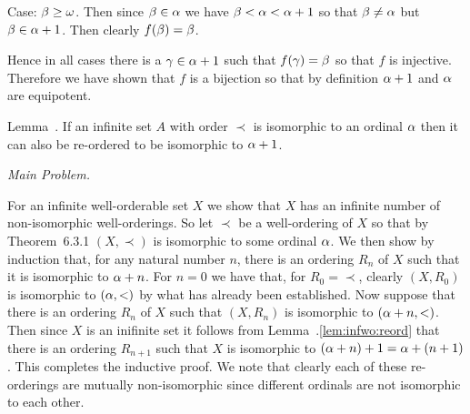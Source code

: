 \begin{solution}
{      Case: $\beta \geq \omega$.
      Then since $\beta \in \alpha$ we have $\beta < \alpha < \alpha+1$ so that $\beta \neq \alpha$ but $\beta \in \alpha+1$.
      Then clearly $f(\beta) = \beta$.

      Hence in all cases there is a $\gamma \in \alpha+1$ such that $f(\gamma) = \beta$ so that $f$ is injective.
      Therefore we have shown that $f$ is a bijection so that by definition $\alpha+1$ and $\alpha$ are equipotent. \qedsymbol

      \begin{statement}{Lemma~\ex.}
        If an infinite set $A$ with order $\prec$ is isomorphic to an ordinal $\alpha$ then it can also be re-ordered to be isomorphic to $\alpha + 1$.
      \end{statement}


      \emph{Main Problem.}

      For an infinite well-orderable set $X$ we show that $X$ has an infinite number of non-isomorphic well-orderings.
      So let $\prec$ be a well-ordering of $X$ so that by Theorem~6.3.1 $(X, \prec)$ is isomorphic to some ordinal $\alpha$.
      We then show by induction that, for any natural number $n$, there is an ordering $R_n$ of $X$ such that it is isomorphic to $\alpha + n$.
      For $n=0$ we have that, for $R_0 = \prec$, clearly $(X, R_0)$ is isomorphic to $(\alpha, <)$ by what has already been established.
      Now suppose that there is an ordering $R_n$ of $X$ such that $(X, R_n)$ is isomorphic to $(\alpha + n, <)$.
      Then since $X$ is an inifinite set it follows from Lemma~\ex.\ref{lem:infwo:reord} that there is an ordering $R_{n+1}$ such that $X$ is isomorphic to $(\alpha + n) + 1 = \alpha + (n+1)$.
      This completes the inductive proof.
      We note that clearly each of these re-orderings are mutually non-isomorphic since different ordinals are not isomorphic to each other. \qedsymbol
    }
\end{solution}

